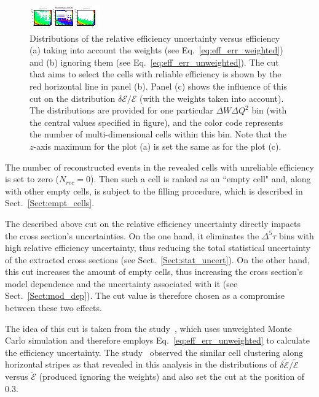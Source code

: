 \begin{figure}[htp]
\begin{center}
\includegraphics[width=\textwidth]{pictures/cross_section/eff_err/eff_err_16375.pdf}
\caption{\small Distributions of the relative efficiency uncertainty versus efficiency (a) taking into account the weights (see Eq.~\eqref{eq:eff_err_weighted}) and (b) ignoring them (see Eq.~\eqref{eq:eff_err_unweighted}). The cut that aims to select the cells with reliable efficiency is shown by the red horizontal line in panel (b).  Panel (c) shows the influence of this cut on the distribution $\delta \mathcal{E}/\mathcal{E}$ (with the weights taken into account). The distributions are provided for one particular $\Delta W \Delta Q^2$ bin (with the central values specified in figure), and the color code represents the number of multi-dimensional cells within this bin. Note that the $z$-axis maximum for the plot (a) is set the same as for the plot (c).} \label{fig:eff_err}
\end{center}
\end{figure}


The number of reconstructed events in the revealed cells with unreliable efficiency is set to zero ($N_{rec} = 0$). Then such a cell is ranked as an ``empty cell" and, along with other empty cells, is subject to the filling procedure, which is described in Sect.~\ref{Sect:empt_cells}. 


The described above cut on the relative efficiency uncertainty directly impacts the cross section's uncertainties. On the one hand, it eliminates the $\Delta^{5} \tau$ bins with high relative efficiency uncertainty, thus reducing the total statistical uncertainty of the extracted cross sections (see Sect.~\ref{Sect:stat_uncert}). On the other hand, this cut increases the amount of empty cells, thus increasing the cross section's model dependence and the uncertainty associated with it (see Sect.~\ref{Sect:mod_dep}). The cut value is therefore chosen as a compromise between these two effects. 


The idea of this cut is taken from the study~\cite{Fed_an_note:2017,Fed_paper_2018}, which uses unweighted Monte Carlo simulation and therefore employs Eq.~\eqref{eq:eff_err_unweighted} to calculate the efficiency uncertainty. The study~\cite{Fed_an_note:2017,Fed_paper_2018} observed the similar cell clustering along horizontal stripes as that revealed in this analysis in the distributions of $\delta \widetilde{\mathcal{E}}/\widetilde{\mathcal{E}}$ versus $\widetilde{\mathcal{E}}$ (produced ignoring the weights) and also set the cut at the position of 0.3. 


